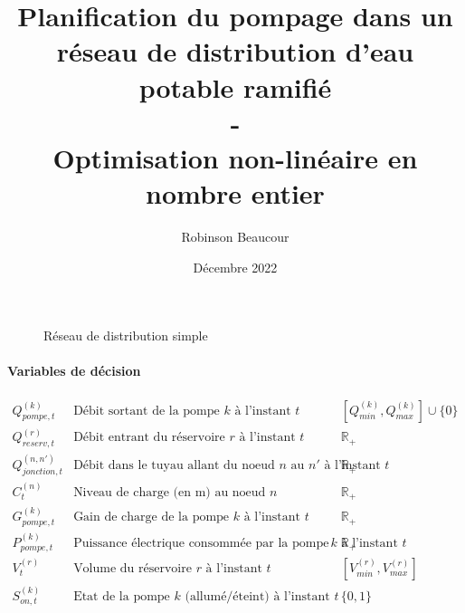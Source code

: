 \documentclass{article}
\title{Planification du pompage dans un réseau de distribution d'eau potable ramifié\\-\\Optimisation non-linéaire en nombre entier}
\author{Robinson Beaucour}
\date{Décembre 2022}
\begin{document}
\maketitle

\begin{figure}[h]
    \centering
    \caption{Réseau de distribution simple}
\end{figure}

\paragraph{Variables de décision}
$$
\left.
    \begin{array}{lll}
        Q_{pompe,t}^{(k)}       &   \text{Débit sortant de la pompe $k$ à l'instant $t$}    & [Q_{min}^{(k)},Q_{max}^{(k)}]\cup\{0\}\\[0.2cm]
        Q_{reserv,t}^{(r)}      &   \text{Débit entrant du réservoire $r$ à l'instant $t$}  & \mathbb{R}_+\\[0.2cm]
        Q_{jonction,t}^{(n,n')}   &   \text{Débit dans le tuyau allant du noeud $n$ au $n'$ à l'instant $t$}  &   \mathbb{R}_+\\[0.2cm]
        C_t^{(n)}               &   \text{Niveau de charge (en m) au noeud $n$}             & \mathbb{R}_+\\[0.2cm]
        G_{pompe,t}^{(k)}       &   \text{Gain de charge de la pompe $k$ à l'instant $t$}   & \mathbb{R}_+\\[0.2cm]
        P_{pompe,t}^{(k)}       &   \text{Puissance électrique consommée par la pompe $k$ à l'instant $t$}& \mathbb{R}_+\\[0.2cm]
        V_t^{(r)}               &   \text{Volume du réservoire $r$ à l'instant $t$}& [V_{min}^{(r)},V_{max}^{(r)}]\\[0.2cm]
        S_{on,t}^{(k)}          &   \text{Etat de la pompe $k$ (allumé/éteint) à l'instant $t$}&\{0,1\}\\[0.2cm]
    \end{array}
\right.
$$
\end{document}
